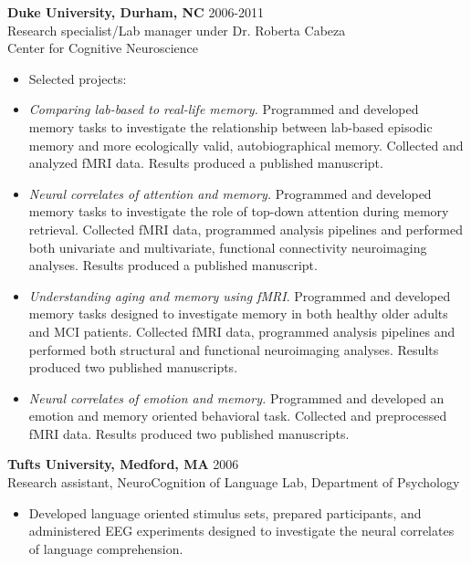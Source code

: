 \documentclass[line,margin,10pt]{res}
\begin{document}
\begin{resume}
\textbf{Duke University, Durham, NC } \hfill 2006-2011 \\
Research specialist/Lab manager under Dr. Roberta Cabeza\\
Center for Cognitive Neuroscience
\begin{itemize} \itemsep -2pt
\item  []Selected projects:
\item \emph{Comparing lab-based to real-life memory.} Programmed and developed memory tasks to investigate the relationship between lab-based episodic memory and more ecologically valid, autobiographical memory. Collected and analyzed fMRI data. Results produced a published manuscript. 
\item \emph{Neural correlates of attention and memory.} Programmed and developed memory tasks to investigate the role of top-down attention during memory retrieval. Collected fMRI data, programmed analysis pipelines and performed both univariate and multivariate, functional connectivity neuroimaging analyses. Results produced a published manuscript.
\item \emph{Understanding aging and memory using fMRI}. Programmed and developed memory tasks designed to investigate memory in both healthy older adults and MCI patients. Collected fMRI data, programmed analysis pipelines and performed both structural and functional neuroimaging analyses. Results produced two published manuscripts.
\item \emph{Neural correlates of emotion and memory.} Programmed and developed an emotion and memory oriented behavioral task. Collected and preprocessed fMRI data. Results produced two published manuscripts. 
\end{itemize}

\textbf{Tufts University, Medford, MA } \hfill 2006\\
Research assistant, NeuroCognition of Language Lab, Department of Psychology
\begin{itemize} \itemsep -2pt
\item  []Developed language oriented stimulus sets, prepared participants, and administered EEG experiments designed to investigate the neural correlates of language comprehension. 
\end{itemize}


\end{resume}
\end{document}
